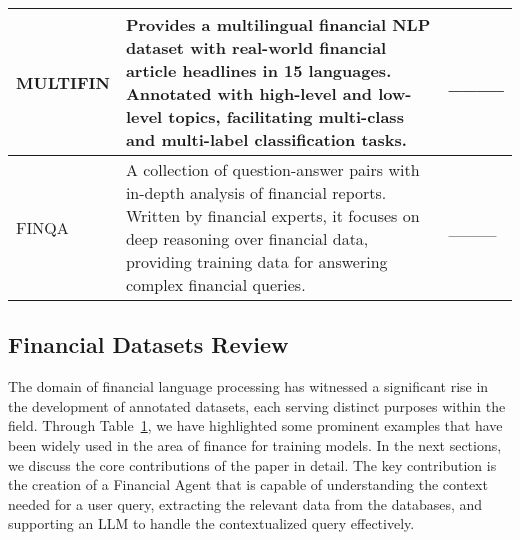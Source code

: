 \begin{table}[!h]
\begin{tabular}{|p{}|p{}|p{}|}
        MULTIFIN & Provides a multilingual financial NLP dataset with real-world financial article headlines in 15 languages. Annotated with high-level and low-level topics, facilitating multi-class and multi-label classification tasks. & ____ \\ \hline
        FINQA & A collection of question-answer pairs with in-depth analysis of financial reports. Written by financial experts, it focuses on deep reasoning over financial data, providing training data for answering complex financial queries. & ____ \\ \hline
    \end{tabular}
    \vspace{-5mm}
    \label{tab:financial-datasets}
\end{table}

\subsection{Financial Datasets Review}   
The domain of financial language processing has witnessed a significant rise in the development of annotated datasets, each serving distinct purposes within the field. Through Table~\ref{tab:financial-datasets}, we have highlighted some prominent examples that have been widely used in the area of finance for training models. In the next sections, we discuss the core contributions of the paper in detail. The key contribution is the creation of a Financial Agent that is capable of understanding the context needed for a user query, extracting the relevant data from the databases, and supporting an LLM to handle the contextualized query effectively.


